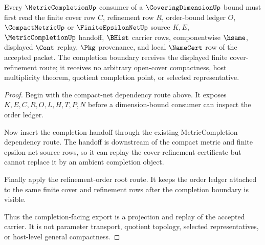 \begin{theorem}
\label{thm:coveringdimension-metric-completion-root-route}
Every $\MetricCompletionUp$ consumer of a $\CoveringDimensionUp$ bound must first read the finite cover row $C$, refinement row $R$, order-bound ledger $O$, $\CompactMetricUp$ or $\FiniteEpsilonNetUp$ source $K,E$, $\MetricCompletionUp$ handoff, $\BHist$ carrier rows, componentwise $\hsame$, displayed $\Cont$ replay, $\Pkg$ provenance, and local $\NameCert$ row of the accepted packet. The completion boundary receives the displayed finite cover-refinement route; it receives no arbitrary open-cover compactness, host multiplicity theorem, quotient completion point, or selected representative.
\end{theorem}
\begin{proof}
Begin with the compact-net dependency route above. It exposes $K,E,C,R,O,L,H,T,P,N$ before a dimension-bound consumer can inspect the order ledger.

Now insert the completion handoff through the existing MetricCompletion dependency route. The handoff is downstream of the compact metric and finite epsilon-net source rows, so it can replay the cover-refinement certificate but cannot replace it by an ambient completion object.

Finally apply the refinement-order root route. It keeps the order ledger attached to the same finite cover and refinement rows after the completion boundary is visible.

Thus the completion-facing export is a projection and replay of the accepted carrier. It is not parameter transport, quotient topology, selected representatives, or host-level general compactness.
\end{proof}
